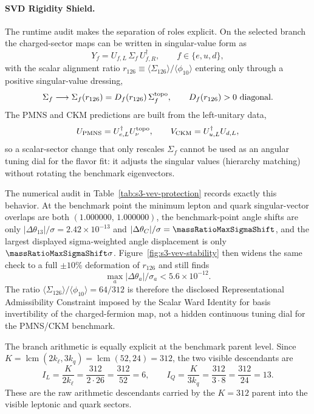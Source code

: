 \documentclass[11pt]{article}
\begin{document}
\paragraph*{SVD Rigidity Shield.}
The runtime audit makes the separation of roles explicit. On the selected
branch the charged-sector maps can be written in singular-value form as
\begin{equation}
 Y_f
 =
 U_{f,L}\,\Sigma_f\,U_{f,R}^{\dagger},
 \qquad
 f\in\{e,u,d\},
\end{equation}
with the scalar alignment ratio
$r_{126}\equiv\langle \Sigma_{126} \rangle/\langle \phi_{10} \rangle$
entering only through a positive singular-value dressing,
\begin{equation}
 \Sigma_f
 \longrightarrow
 \Sigma_f(r_{126})
 =
 D_f(r_{126})\,\Sigma_f^{\rm topo},
 \qquad
 D_f(r_{126})>0\ \text{diagonal}.
\end{equation}
The PMNS and CKM predictions are built from the left-unitary data,
\begin{equation}
 U_{\rm PMNS}=U_{e,L}^{\dagger}U_{\nu}^{\rm topo},
 \qquad
 V_{\rm CKM}=U_{u,L}^{\dagger}U_{d,L},
\end{equation}
so a scalar-sector change that only rescales $\Sigma_f$ cannot be used as an
angular tuning dial for the flavor fit: it adjusts the singular values
(hierarchy matching) without rotating the benchmark eigenvectors.

The numerical audit in Table~\ref{tab:s3-vev-protection} records exactly this
behavior. At the benchmark point the minimum lepton and quark singular-vector
overlaps are both $(1.000000,\,1.000000)$, the benchmark-point angle shifts
are only $|\Delta\theta_{13}|/\sigma=2.42\times10^{-13}$ and
$|\Delta\theta_{C}|/\sigma=\massRatioMaxSigmaShift$, and the largest displayed
sigma-weighted angle displacement is only
$\massRatioMaxSigmaShift\sigma$. Figure~\ref{fig:s3-vev-stability} then
widens the same check to a full $\pm10\%$ deformation of $r_{126}$ and still
finds
\begin{equation}
 \max_a |\Delta\theta_a|/\sigma_a < 5.6\times10^{-12}.
\end{equation}
The ratio $\langle \Sigma_{126} \rangle/\langle \phi_{10} \rangle=64/312$ is
therefore the disclosed Representational Admissibility Constraint imposed by
the Scalar Ward Identity for basis invertibility of the charged-fermion map,
not a hidden continuous tuning dial for the PMNS/CKM benchmark.

The branch arithmetic is equally explicit at the benchmark parent level. Since
$K=\operatorname{lcm}(2k_{\ell},3k_q)=\operatorname{lcm}(52,24)=312$, the two
visible descendants are
\begin{equation}
 I_L
 =
 \frac{K}{2k_{\ell}}
 =
 \frac{312}{2\cdot26}
 =
 \frac{312}{52}
 = 6,
 \qquad
 I_Q
 =
 \frac{K}{3k_q}
 =
 \frac{312}{3\cdot8}
 =
 \frac{312}{24}
 = 13.
\end{equation}
These are the raw arithmetic descendants carried by the $K=312$ parent into the
visible leptonic and quark sectors.
\end{document}
